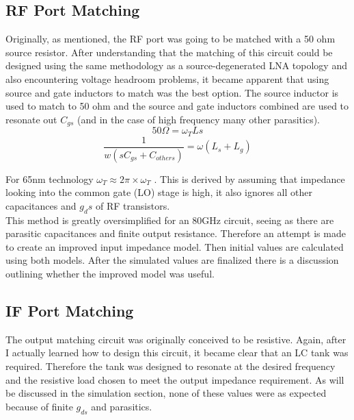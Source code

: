 \documentclass{article}                                                         %
\begin{document}
\subsection{RF Port Matching}
Originally, as mentioned, the RF port was going to be matched with a 50 ohm source resistor. After understanding that the
matching of this circuit could be designed using the same methodology as a source-degenerated LNA topology and also encountering
voltage headroom problems, it became apparent that using source and gate inductors to match was the best option. The source inductor is used to match to 50 ohm
and the source and gate inductors combined are used to resonate out $C_{gs}$ (and in the case of high frequency many other parasitics).
\begin{equation}
  \label{eq:InputRes}
  50 \Omega = \omega_TLs
\end{equation}
\begin{equation}
  \label{eq:GateInd}
  \dfrac{1}{w(sC_{gs}+C_{others})} = \omega(L_s+L_g)
\end{equation}

\vspace{3mm}For 65nm technology $\omega_T \approx 2\pi \times \omega_T$ \cite{Razavi:2011:RM:2132691}. This is derived by assuming that impedance looking into the common gate (LO) stage is high,
it also ignores all other capacitances and $g_ds$ of RF transistors. \\

This method is greatly oversimplified for an 80GHz circuit, seeing as there are parasitic capacitances and finite output resistance. Therefore an attempt is made to create an improved input impedance model. Then initial values
are calculated using both models. After the simulated values are finalized there is a discussion outlining whether the improved model was useful.

\subsection{IF Port Matching}
The output matching circuit was originally conceived to be resistive. Again, after I actually learned how to design this circuit,
it became clear that an LC tank was required. Therefore the tank was designed to resonate at the desired frequency and the resistive
load chosen to meet the output impedance requirement. As will be discussed in the simulation section, none of these values were as expected
because of finite $g_{ds}$ and parasitics.
\end{document}
